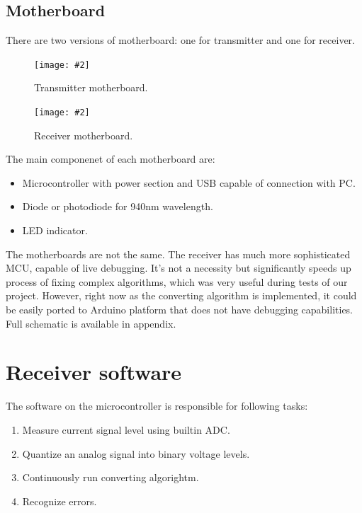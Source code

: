 \documentclass[12pt]{article}
\newcommand{\image}[3]{
\begin{figure}[h]
	\begin{center}
		\texttt{[image: \#2]}
	\end{center}
  \caption{#1}
\end{figure}}
\begin{document}
  \subsection{Motherboard}
  There are two versions of motherboard: one for transmitter and one for receiver.


\image{Transmitter motherboard.}{transmitter_overview.png}{0.3}
\image{Receiver motherboard.}{receiver_overview.png}{0.3}
The main componenet of each motherboard are:
\begin{itemize}
  \item Microcontroller with power section and USB capable of connection with PC.
  \item Diode or photodiode for 940nm wavelength.
  \item LED indicator.
\end{itemize}
The motherboards are not the same. The receiver has much more sophisticated MCU, capable of live debugging.
It's not a necessity but significantly speeds up process of fixing complex algorithms, which was very useful during 
tests of our project. However, right now as the converting algorithm is implemented, it could be easily ported to Arduino platform that does not have debugging capabilities.
Full schematic is available in appendix.
	
	\section{Receiver software}
  The software on the microcontroller is responsible for following tasks:
  \begin{enumerate}
    \item Measure current signal level using builtin ADC.
    \item Quantize an analog signal into binary voltage levels.
    \item Continuously run converting algorightm.
    \item Recognize errors.
  \end{enumerate}
\end{document}
